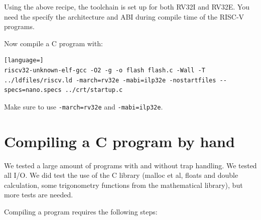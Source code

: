 \documentclass[12pt]{article}
\begin{document}
Using the above recipe, the toolchain is set up for both RV32I and RV32E. You need the specify the architecture and ABI during compile time of the RISC-V programs.

Now compile a C program with:

\begin{lstlisting}[language=]
riscv32-unknown-elf-gcc -O2 -g -o flash flash.c -Wall -T ../ldfiles/riscv.ld -march=rv32e -mabi=ilp32e -nostartfiles --specs=nano.specs ../crt/startup.c
\end{lstlisting}

Make sure to use \texttt{-march=rv32e} and \texttt{-mabi=ilp32e}.


\section{Compiling a C program by hand}
We tested a large amount of programs with and without trap handling. We tested all I/O. We did test the use of the C library (malloc et al, floats and double calculation, some trigonometry functions from the mathematical library), but more tests are needed.

Compiling a program requires the following steps:
\end{document}
